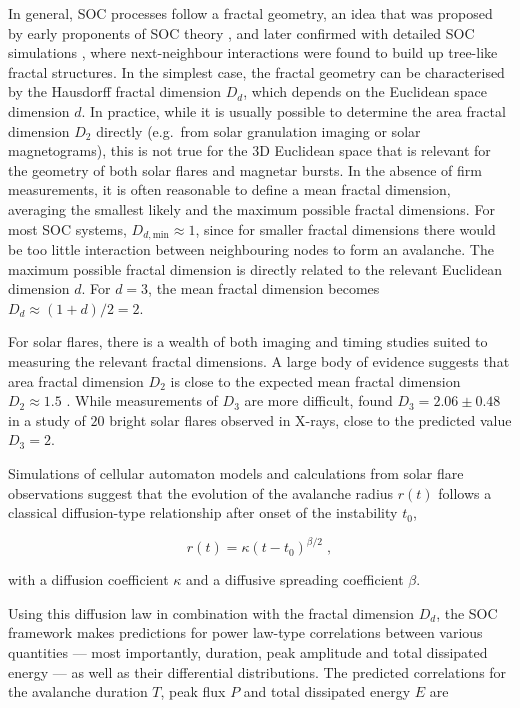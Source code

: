 \documentclass[12pt]{emulateapj}
\begin{document}
In general, SOC processes follow a fractal geometry, an idea that was proposed by early proponents of SOC theory \citep{bak1989}, and later
confirmed with detailed SOC simulations \citep{aschwanden2012a}, where next-neighbour interactions were found to build up tree-like fractal structures. In the simplest case,
the fractal geometry can be characterised by the Hausdorff fractal dimension $D_d$, which depends on the Euclidean space
dimension $d$. In practice, while it is usually possible to determine the area fractal dimension $D_2$ directly (e.g.\ from solar granulation imaging or solar
magnetograms), this is not true for the $3$D Euclidean space that is relevant for the geometry of both solar flares and magnetar bursts. 
In the absence of firm measurements, it is often reasonable to define a mean fractal dimension, averaging the smallest likely and the maximum possible fractal dimensions.
For most SOC systems, $D_{d,\mathrm{min}} \approx 1$, since for smaller fractal dimensions there would be too little interaction between neighbouring nodes to form an avalanche.
The maximum possible fractal dimension is directly related to the relevant Euclidean dimension $d$. For $d=3$, the mean fractal dimension becomes $D_d \approx (1+d)/2 = 2$. 

For solar flares, there is a wealth of both imaging and timing studies suited to measuring the relevant fractal dimensions. A large body of evidence suggests that area fractal dimension $D_2$ is
close to the expected mean fractal dimension $D_2 \approx 1.5$ \citep[see Table 8 in ][ and references therein]{aschwanden2014}. 
While measurements of $D_3$ are more difficult, \citet{aschwanden2008} found $D_3 = 2.06 \pm 0.48$
in a study of $20$ bright solar flares observed in X-rays, close to the predicted value $D_3 = 2$. 

Simulations of cellular automaton models \citep{aschwanden2012a} and calculations from solar flare observations \citep{aschwanden2012b,aschwanden2013a,aschwanden2013b} 
suggest that the evolution of the avalanche radius $r(t)$ follows a classical diffusion-type relationship after onset of the instability $t_0$, 

\begin{equation}
r(t) = \kappa(t- t_0)^{\beta/2}\; ,
\end{equation}

with a diffusion coefficient $\kappa$ and a diffusive spreading coefficient $\beta$.

Using this diffusion law in combination with the fractal dimension $D_d$, the SOC framework makes predictions for 
power law-type correlations between various quantities --- most importantly, duration, 
peak amplitude and total dissipated energy ---  as well as their differential distributions.
The predicted correlations for the avalanche duration $T$, peak flux $P$ and total dissipated energy $E$ are
\end{document}

